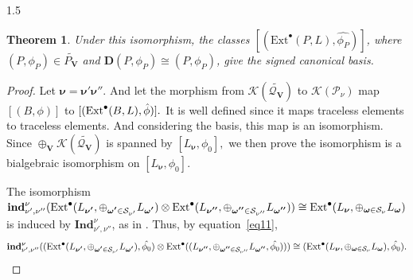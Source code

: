\documentclass[10pt]{amsart}
\newtheorem{theorem}{Theorem}[section]
\def\Ext{\mbox{\rm Ext}}   \def\Ker{\mbox{\rm Ker}\,}
\def\bfV{{\mathbf V}}
\def\bfV{\mathbf{V}}
\def\Ind{\mathbf{Ind}}
\def\ind{\mathbf{ind}}
\newcommand\mk{{\mathcal{K}}}
\newcommand\mq{{\mathcal{Q}}}
\begin{document}
\begin{spacing}{1.5}
\begin{theorem}
Under this isomorphism, the classes $[(\mathrm{Ext}^{\bullet}(P, L), \hat{\phi_P})]$, where $(P,\phi_P)\in \widetilde{P_{\bfV}}$ and $\mathbf{D}(P,\phi_P)\cong(P,\phi_P)$, give the signed canonical basis. 
\end{theorem}
\begin{proof}
   Let $\boldsymbol{\nu}=\boldsymbol{\nu'\nu''}.$
   And let the morphism from  $\mk(\widetilde{\mq_{\bfV}})$ to $\mathcal{K}(\mathcal{P}_{\nu})$ map $[(B,\phi)]$ to $[(\Ext^{\bullet}(B,L),\hat{\phi})].$ It is well defined since it maps traceless elements to traceless elements. And considering the basis, this map is an isomorphism. Since $\oplus_{\bfV}\mk(\widetilde{\mq_{\bfV}})$ is spanned by $[L_{\boldsymbol{\nu}},\phi_0],$ we then prove the isomorphism is a bialgebraic isomorphism on $[L_{\boldsymbol{\nu}},\phi_0].$
   
   The isomorphism
    $\ind_{\nu',\nu''}^{\nu}(\Ext^{\bullet}(L_{\boldsymbol{\nu'}},\oplus_{\boldsymbol{\omega'}\in \mathcal{S}_{\nu'}}L_{\boldsymbol{\omega'}})\otimes \Ext^{\bullet}(L_{\boldsymbol{\nu''}},\oplus_{\boldsymbol{\omega''}\in \mathcal{S}_{\nu''}}L_{\boldsymbol{\omega''}}))\cong \Ext^{\bullet}(L_{\boldsymbol{\nu}},\oplus_{\boldsymbol{\omega}\in \mathcal{S}_{\nu}}L_{\boldsymbol{\omega}})$ is induced by $\Ind_{\nu',\nu''}^{\nu}$, as in \cite[Remark 4.8]{VaragnoloVasserot+2011+67+100}. Thus, by equation~\ref{eq11},
    $$\ind_{\nu',\nu''}^{\nu}((\Ext^{\bullet}(L_{\boldsymbol{\nu'}},\oplus_{\boldsymbol{\omega'}\in \mathcal{S}_{\nu'}}L_{\boldsymbol{\omega'}}),\hat{\phi_0})\otimes \Ext^{\bullet}((L_{\boldsymbol{\nu''}},\oplus_{\boldsymbol{\omega''}\in \mathcal{S}_{\nu''}}L_{\boldsymbol{\omega''}},\hat{\phi_0})))\cong (\Ext^{\bullet}(L_{\boldsymbol{\nu}},\oplus_{\boldsymbol{\omega}\in \mathcal{S}_{\nu}}L_{\boldsymbol{\omega}}),\hat{\phi_0}).$$


\end{proof}
\end{spacing}
\end{document}
